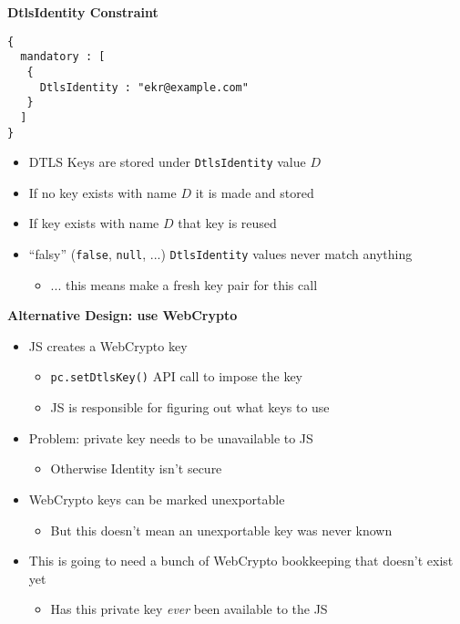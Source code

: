 \documentclass[helvetica]{seminar}
\newcommand{\heading}[1]{%
  \begin{center} 
    \large\bf 
    #1 
  \end{center} 
  \vspace{.4 in}}
\begin{document}
\begin{slide}
\heading{DtlsIdentity Constraint}

\vspace{-.25in}
\begin{verbatim}
{
  mandatory : [
   {
     DtlsIdentity : "ekr@example.com"
   }
  ] 
}
\end{verbatim}

\begin{itemize}
\item DTLS Keys are stored under \verb^DtlsIdentity^ value $D$
\item If no key exists with name $D$ it is made and stored
\item If key exists with name $D$ that key is reused
\item ``falsy'' (\verb^false^, \verb^null^, ...) \verb^DtlsIdentity^ values never match anything
  \begin{itemize}
    \item ... this means make a fresh key pair for this call
  \end{itemize}
\end{itemize}
\end{slide}


\begin{slide}
\heading{Alternative Design: use WebCrypto}

\begin{itemize}
\item JS creates a WebCrypto key
  \begin{itemize}
  \item \verb^pc.setDtlsKey()^ API call to impose the key
  \item JS is responsible for figuring out what keys to use
  \end{itemize}

\item Problem: private key needs to be unavailable to JS
  \begin{itemize}
    \item Otherwise Identity isn't secure
  \end{itemize}

\item WebCrypto keys can be marked unexportable
  \begin{itemize}
  \item But this doesn't mean an unexportable key was never known
  \end{itemize}

\item This is going to need a bunch of WebCrypto bookkeeping that doesn't exist 
yet
\begin{itemize}
\item Has this private key \emph{ever} been available to the JS
\end{itemize}
\end{itemize}

\end{slide}
\end{document}
